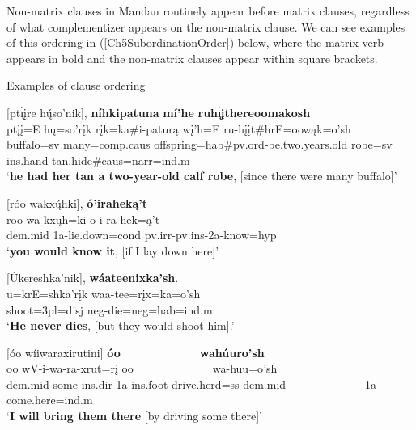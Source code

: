 Non-matrix clauses in Mandan routinely appear before matrix clauses, regardless of what complementizer appears on the non-matrix clause. We can see examples of this ordering in (\ref{Ch5SubordinationOrder}) below, where the matrix verb appears in bold and the non-matrix clauses appear within square brackets.

\begin{exe}
    \item\label{Ch5SubordinationOrder} Examples of clause ordering

    \begin{xlist}
        \item\label{Ch5SubordinationOrderA} \glll \textnormal{[}pt\'{ı̨}įre hų́so'nik\textnormal{]}, \textbf{níhkipatuna} \textbf{mí'he} \textbf{ruh\'{ı̨}įthereoomakosh}\\
        ptįį=E hų=so'rįk rįk=ka\#i-paturą wį'h=E ru-hįįt\#hrE=oowąk=o'sh\\
        \textnormal{buffalo}=sv \textnormal{many}=comp.caus \textnormal{offspring}=hab\#pv.ord-\textnormal{be.two.years.old} \textnormal{robe}=sv ins.hand-\textnormal{tan.hide}\#caus=narr=ind.m\\
        \glt `\textbf{he had her tan a two-year-old calf robe}, [since there were many buffalo]' \citep[280]{hollow1973b}
        
        \item\label{Ch5SubordinationOrderB} \glll \textnormal{[}róo wakxų́hki\textnormal{]}, \textbf{ó'iraheką't}\\
        roo wa-kxųh=ki o-i-ra-hek=ą't\\
        dem.mid 1a-\textnormal{lie.down}=cond pv.irr-pv.ins-2a-\textnormal{know}=hyp\\
        \glt `\textbf{you would know it}, [if I lay down here]' \citep[1]{hollow1973a}

        \item\label{Ch5SubordinationOrderC} \glll \textnormal{[}Úkereshka'nik\textnormal{]}, \textbf{wáateenixka'sh}.\\
        u=krE=shka'rįk waa-tee=rįx=ka=o'sh\\
        \textnormal{shoot}=3pl=disj neg-\textnormal{die}=neg=hab=ind.m\\
        \glt `\textbf{He never dies}, [but they would shoot him].' \citep[117]{hollow1973b}

        \item\label{Ch5SubordinationOderD} \glll \textnormal{[}óo wíiwaraxirutini\textnormal{]} \textbf{óo} ~ ~ ~ ~ ~ ~ ~ ~ \textbf{wahúuro'sh}\\
        oo wV-i-wa-ra-xrut=rį oo ~ ~ ~ ~ ~ ~ ~ ~ wa-huu=o'sh\\
        dem.mid \textnormal{some}-ins.dir-1a-ins.foot-\textnormal{drive.herd}=ss dem.mid ~ ~ ~ ~ ~ ~ ~ ~ 1a-\textnormal{come.here}=ind.m\\
        \glt `\textbf{I will bring them there} [by driving some there]' \citep[255]{trechter2012b}


\end{xlist}
\end{exe}
